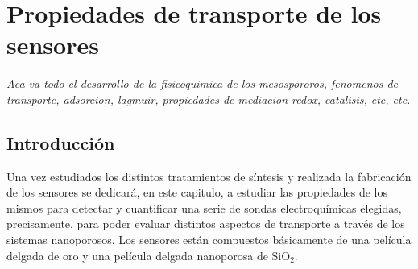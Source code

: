  \newcommand{\NoBiblioEQ}[1]{
 \ifthenelse{\equal{#1}{verdadero}}{}{}
 \NoBiblioEQ{verdadero}}


 \FormatoCapituloDosLineas
 
 \chapter{Propiedades de transporte de los sensores}
 \label{chap:Electroquimica}

 \thispagestyle{empty}
	
 \noindent\textit{Aca va todo el desarrollo de la fisicoquimica de los mesospororos, fenomenos de  transporte, adsorcion, lagmuir, propiedades de mediacion redox, catalisis, etc, etc.}

 \vfill
 \minitoc
 \newpage

\section{Introducción}

	Una vez estudiados los distintos tratamientos de síntesis y realizada la fabricación de los sensores se dedicará, en este capitulo, a estudiar las propiedades de los mismos para detectar y cuantificar una serie de sondas electroquímicas elegidas, precisamente, para poder evaluar distintos aspectos de transporte a través de los sistemas nanoporosos. 
	Los sensores están compuestos básicamente de una película delgada de oro y una película delgada nanoporosa de SiO$_2$. 

